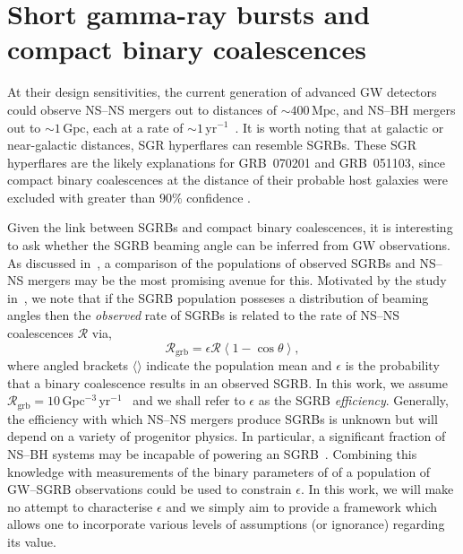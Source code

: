 \documentclass[twocolumn,nofootinbib]{revtex4-1}
\newcommand{\grbrate}{{{\mathcal R}_{\mathrm{grb}}}}
\newcommand{\cbcrate}{{{\mathcal R}}}
\newcommand{\mpc}{\mathrm{Mpc}}
\newcommand{\BNS}{\ac{NS}--\ac{NS}\xspace}
\newcommand{\NSBH}{\ac{NS}--\ac{BH}\xspace}
\newcommand{\JOINT}{\ac{GW}--\ac{SGRB}\xspace}
\begin{document}
\section{Short gamma-ray bursts and compact binary coalescences}
\label{sec:sgrbs}
At their design sensitivities, the current generation of advanced
\ac{GW} detectors could observe \BNS mergers out to distances of
$\sim 400\,\mpc$, and \NSBH mergers out to $\sim 1\,$Gpc, each at a rate of
$\sim 1\,$yr$^{-1}$~\cite{Aasi:2013wya}. It is worth noting that at
galactic or near-galactic distances, \ac{SGR} hyperflares can resemble
\acp{SGRB}. These \ac{SGR} hyperflares are the likely explanations
for GRB~070201 and GRB~051103, since compact binary coalescences at
the distance of their probable host galaxies were excluded with
greater than $90\%$ confidence \cite{Abbott:2007rh,Abadie:2012bz}.

Given the link between \acp{SGRB} and compact binary coalescences, it is
interesting to ask whether the \ac{SGRB} beaming angle can be inferred from
\ac{GW} observations. As discussed in~\cite{Clark:2014jpa}, a comparison of
the populations of observed \acp{SGRB} and \BNS mergers may be the most
promising avenue for this. Motivated by the study in~\cite{2013PhRvL.111r1101C},
we note that if the \ac{SGRB} population posseses a distribution of beaming
angles then the \emph{observed} rate of \acp{SGRB} is related to the rate of
\BNS coalescences $\cbcrate$ via,
%
\begin{equation}\label{eq:rate2angle}
    \grbrate = \epsilon\cbcrate \left \langle 1-\cos \theta \right \rangle,
\end{equation}
%
where angled brackets $\langle \rangle$ indicate the population mean
and $\epsilon$ is the probability that a binary coalescence results in
an observed \ac{SGRB}.  In this work, we assume
$\grbrate=10$\,Gpc$^{-3}$\,yr$^{-1}$~\cite{Nakar:2007yr,Dietz:2010eh}
and we shall refer to $\epsilon$ as the \ac{SGRB} \emph{efficiency}.
Generally, the efficiency with which \BNS mergers produce \acp{SGRB}
is unknown but will depend on a variety of progenitor physics.  In
particular, a significant fraction of \NSBH systems may be incapable
of powering an \ac{SGRB}~\cite{Pannarale:2014rea}.  Combining this
knowledge with measurements of the binary parameters of of a
population of \JOINT observations could be used to constrain
$\epsilon$.  In this work, we will make no attempt to characterise
$\epsilon$ and we simply aim to provide a framework which allows one
to incorporate various levels of assumptions (or ignorance) regarding
its value.
\end{document}
